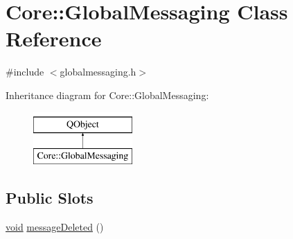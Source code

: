 \hypertarget{class_core_1_1_global_messaging}{\section{Core\-:\-:Global\-Messaging Class Reference}
\label{class_core_1_1_global_messaging}
}


{\ttfamily \#include $<$globalmessaging.\-h$>$}

Inheritance diagram for Core\-:\-:Global\-Messaging\-:\begin{figure}[H]
\begin{center}
\leavevmode
\includegraphics[height=2.000000cm]{class_core_1_1_global_messaging}
\end{center}
\end{figure}
\subsection*{Public Slots}
\begin{DoxyCompactItemize}
\item 
\hyperlink{group___u_a_v_objects_plugin_ga444cf2ff3f0ecbe028adce838d373f5c}{void} \hyperlink{group___core_plugin_ga4f5538b2b5ae1c4b21a31fcb26b35f5d}{message\-Deleted} ()
\end{DoxyCompactItemize}

